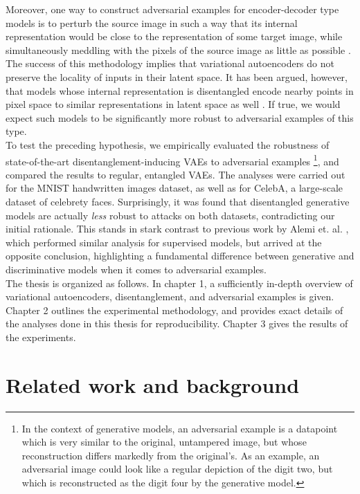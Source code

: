 \documentclass{report}
\begin{document}
\noindent Moreover, one way to construct adversarial examples for encoder-decoder type models is to perturb the source image in such a way that its internal representation would be close to the representation of some target image, while simultaneously meddling with the pixels of the source image as little as possible \cite{kos-gen-adv, tabacof-gen-adv}. The success of this methodology implies that variational autoencoders do not preserve the locality of inputs in their latent space. It has been argued, however, that models whose internal representation is disentangled encode nearby points in pixel space to similar representations in latent space as well \cite{beta-vae}. If true, we would expect such models to be significantly more robust to adversarial examples of this type. \\

\noindent To test the preceding hypothesis, we empirically evaluated the robustness of state-of-the-art disentanglement-inducing VAEs to adversarial examples \footnote{In the context of generative models, an adversarial example is a datapoint which is very similar to the original, untampered image, but whose reconstruction differs markedly from the original's. As an example, an adversarial image could look like a regular depiction of the digit two, but which is reconstructed as the digit four by the generative model.}, and compared the results to regular, entangled VAEs. The analyses were carried out for the MNIST handwritten images dataset, as well as for CelebA, a large-scale dataset of celebrety faces. Surprisingly, it was found that disentangled generative models are actually \textit{less} robust to attacks on both datasets, contradicting our initial rationale. This stands in stark contrast to previous work by Alemi et. al. \cite{deep-variational-bottleneck}, which performed similar analysis for supervised models, but arrived at the opposite conclusion, highlighting a fundamental difference between generative and discriminative models when it comes to adversarial examples. \\

\noindent The thesis is organized as follows. In chapter 1, a sufficiently in-depth overview of variational autoencoders, disentanglement, and adversarial examples is given. Chapter 2 outlines the experimental methodology, and provides exact details of the analyses done in this thesis for reproducibility. Chapter 3 gives the results of the experiments. 

\chapter{Related work and background}
\end{document}
